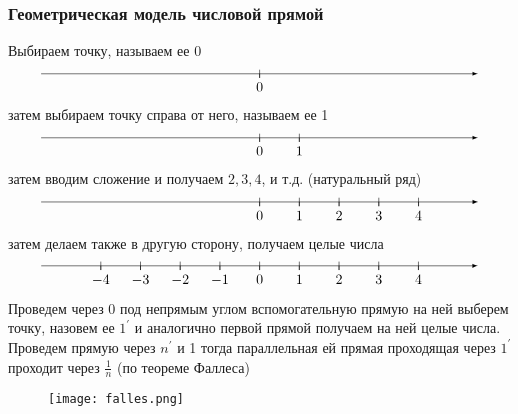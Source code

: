 \documentclass[a4paper, 12pt]{article}
\theoremstyle{definition}
\begin{document}
    \subsubsection*{Геометрическая модель числовой прямой}
    Выбираем точку, называем ее 0
    \[\begin{tikzpicture}
        \draw[-latex] (-5.5,0) -- (5.5,0) ;
        \foreach \x in  {0}
        \draw[shift={(\x,0)},color=black] (0pt,3pt) -- (0pt,-3pt);
        \foreach \x in {0}
        \draw[shift={(\x,0)},color=black] (0pt,0pt) -- (0pt,-3pt) node[below] 
        {$\x$};
        \end{tikzpicture}\]
        затем выбираем точку справа от него, называем ее 1
        \[\begin{tikzpicture}
        \draw[-latex] (-5.5,0) -- (5.5,0) ;
        \foreach \x in {0,1}
        \draw[shift={(\x,0)},color=black] (0pt,3pt) -- (0pt,-3pt);
        \foreach \x in {0,1}
        \draw[shift={(\x,0)},color=black] (0pt,0pt) -- (0pt,-3pt) node[below] 
        {$\x$};
        \end{tikzpicture}\]
        затем вводим сложение и получаем $2, 3, 4$, и т.д. (натуральный ряд)
        \[\begin{tikzpicture}
        \draw[-latex] (-5.5,0) -- (5.5,0) ;
        \foreach \x in {0,1,2,3,4}
        \draw[shift={(\x,0)},color=black] (0pt,3pt) -- (0pt,-3pt);
        \foreach \x in {0,1,2,3,4}
        \draw[shift={(\x,0)},color=black] (0pt,0pt) -- (0pt,-3pt) node[below] 
        {$\x$};
        \end{tikzpicture}\]
        затем делаем также в другую сторону, получаем целые числа
        \[\begin{tikzpicture}
        \draw[-latex] (-5.5,0) -- (5.5,0) ;
        \foreach \x in {-4,-3,-2,-1,0,1,2,3,4}
        \draw[shift={(\x,0)},color=black] (0pt,3pt) -- (0pt,-3pt);
        \foreach \x in {-4,-3,-2,-1,0,1,2,3,4}
        \draw[shift={(\x,0)},color=black] (0pt,0pt) -- (0pt,-3pt) node[below] 
        {$\x$};
        \end{tikzpicture}\]
        Проведем через 0 под непрямым углом вспомогательную прямую на ней выберем точку, назовем ее $1^{\prime}$ и аналогично первой прямой получаем на ней целые числа. Проведем прямую через $n^{\prime}$ и 1 тогда параллельная ей прямая проходящая через $1^{\prime}$ проходит через $\frac{1}{n}$ (по теореме Фаллеса)
        \begin{figure}[h]
            \centering
            \texttt{[image: falles.png]}
        \end{figure}\\
\end{document}
